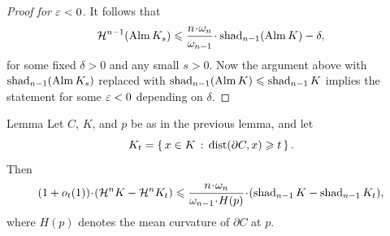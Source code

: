 \documentclass[a4paper,10pt]{article}
\begin{document}
\begin{proof}[Proof for $\varepsilon<0$]

It follows that
\[
\mathcal H^{n-1} (\cont K_s)\le \frac{n\cdot\omega_n}{\omega_{n-1}}\cdot \fav_{n-1}(\cont K)-\delta,
\]
for some fixed $\delta>0$ and any small $s>0$.
Now the argument above with $\mathop{\rm shad}\nolimits_{n-1}(\mathop{\rm Alm} K_s)$ replaced with $\mathop{\rm shad}\nolimits_{n-1}(\mathop{\rm Alm} K)\leqslant \mathop{\rm shad}\nolimits_{n-1}K$ implies the statement for some $\varepsilon<0$ depending on $\delta$.
\end{proof}


\begin{thm}{Lemma}\label{lem:variation}
Let $C$, $K$, and $p$ be as in the previous lemma, and let
\[
K_t=\left\{\,x\in K\,:\,\operatorname{\rm dist}(\partial C, x)\geqslant t\,\right\}.
\]
Then
\[
(1+o_t(1))\cdot(\mathcal H^n K-\mathcal H^n K_t)\le \frac{n\cdot \omega_n}{\omega_{n-1}\cdot H(p)}\cdot(\fav_{n-1}K-\fav_{n-1}K_t),
\]
where $H(p)$ denotes the mean curvature of $\partial C$ at $p$.
\end{thm}
\end{document}

